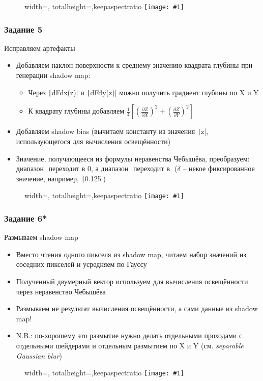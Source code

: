 \documentclass[10pt]{beamer}
\newcommand{\slideimage}[1]{
  \begin{figure}
    \begin{adjustbox}{width=\textwidth, totalheight=\textheight-2\baselineskip-2\baselineskip,keepaspectratio}
      \texttt{[image: \#1]}
    \end{adjustbox}
  \end{figure}
}
\begin{document}
\begin{frame}[fragile]
\slideimage{4.png}
\end{frame}

\begin{frame}[fragile]
\frametitle{Задание 5}
Исправляем артефакты
\begin{itemize}
\item Добавляем наклон поверхности к среднему значению квадрата глубины при генерации shadow map:
\begin{itemize}
\item Через \texttt|dFdx(z)| и \texttt|dFdy(z)| можно получить градиент глубины по X и Y
\item К квадрату глубины добавляем \begin{math}\frac{1}{4}\left[\left(\frac{\partial Z}{\partial X}\right)^2 + \left(\frac{\partial Z}{\partial Y}\right)^2\right]\end{math}
\end{itemize}
\item Добавляем shadow bias (вычитаем константу из значения \texttt|z|, использующегося для вычисления освещённости)
\item Значение, получающееся из формулы неравенства Чебышёва, преобразуем: диапазон \begin{math}[0, \delta]\end{math} переходит в \begin{math}0\end{math}, а диапазон \begin{math}[\delta, 1]\end{math} переходит в \begin{math}[0, 1]\end{math} (\begin{math}\delta\end{math} -- некое фиксированное значение, например, \texttt|0.125|)
\end{itemize}
\end{frame}

\begin{frame}[fragile]
\slideimage{5.png}
\end{frame}

\begin{frame}[fragile]
\frametitle{Задание 6*}
Размываем shadow map
\begin{itemize}
\item Вместо чтения одного пикселя из shadow map, читаем набор значений из соседних пикселей и усредняем по Гауссу
\item Полученный двумерный вектор используем для вычисления освещённости через неравенство Чебышёва
\item Размываем не результат вычисления освещённости, а сами данные из shadow map!
\item {\color{red}N.B.}: по-хорошему это размытие нужно делать отдельными проходами с отдельными шейдерами и отдельным размытием по X и Y (см. \textit{separable Gaussian blur})
\end{itemize}
\end{frame}

\begin{frame}[fragile]
\slideimage{6.png}
\end{frame}
\end{document}
